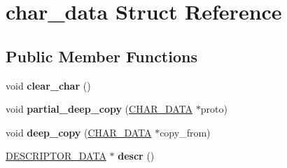 \hypertarget{structchar__data}{\section{char\-\_\-data Struct Reference}
\label{structchar__data}
}
\subsection*{Public Member Functions}
\begin{DoxyCompactItemize}
\item 
\hypertarget{structchar__data_af8247fa1cac183f1ba2c5ebb938905f9}{void {\bfseries clear\-\_\-char} ()}\label{structchar__data_af8247fa1cac183f1ba2c5ebb938905f9}

\item 
\hypertarget{structchar__data_a7e45c8966417517e72a215319c80e057}{void {\bfseries partial\-\_\-deep\-\_\-copy} (\hyperlink{structchar__data}{C\-H\-A\-R\-\_\-\-D\-A\-T\-A} $\ast$proto)}\label{structchar__data_a7e45c8966417517e72a215319c80e057}

\item 
\hypertarget{structchar__data_a214c263f8968e2b43825af6d08cb7102}{void {\bfseries deep\-\_\-copy} (\hyperlink{structchar__data}{C\-H\-A\-R\-\_\-\-D\-A\-T\-A} $\ast$copy\-\_\-from)}\label{structchar__data_a214c263f8968e2b43825af6d08cb7102}

\item 
\hypertarget{structchar__data_aa7058dc7647d018af6abf75cef3b8e58}{\hyperlink{structdescriptor__data}{D\-E\-S\-C\-R\-I\-P\-T\-O\-R\-\_\-\-D\-A\-T\-A} $\ast$ {\bfseries descr} ()}\label{structchar__data_aa7058dc7647d018af6abf75cef3b8e58}

\end{DoxyCompactItemize}
